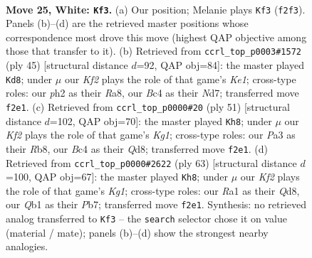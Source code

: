 \documentclass[11pt]{article}
\begin{document}
\clearpage

\begin{figure}[p]\centering
\begin{subfigure}{0.46\textwidth}\centering
\resizebox{\linewidth}{!}{%
\newchessgame
\chessboard[
  setfen={1nb2kr1/4n3/4p3/2q1Pp2/p1B2N2/P7/2P2KPp/RQ5R w - - 0 25},
  showmover=false,
  pgfstyle=straightmove, color=movearrow, markmove={f2-f3}
]}
\caption{}
\end{subfigure}\hfill
\begin{subfigure}{0.46\textwidth}\centering
\resizebox{\linewidth}{!}{%
\newchessgame
\chessboard[
  setfen={r3k2r/1p1nb2p/p1p2q2/2P4B/1P1NQ3/8/P4PP1/3RK3 b kq - 2 23},
  showmover=false,
  pgfstyle=straightmove, color=movearrow, markmove={e8-d8}
]}
\caption{}
\end{subfigure}
\\[4pt]
\begin{subfigure}{0.46\textwidth}\centering
\resizebox{\linewidth}{!}{%
\newchessgame
\chessboard[
  setfen={1r1q1rk1/1b6/4Qp1p/1N4p1/3P3P/P2B2R1/1P4P1/n5K1 b - - 0 26},
  showmover=false,
  pgfstyle=straightmove, color=movearrow, markmove={g8-h8}
]}
\caption{}
\end{subfigure}\hfill
\begin{subfigure}{0.46\textwidth}\centering
\resizebox{\linewidth}{!}{%
\newchessgame
\chessboard[
  setfen={3qr1k1/1pRb4/p2B2Q1/3P1p2/3bp3/7P/PP3PP1/6K1 b - - 5 32},
  showmover=false,
  pgfstyle=straightmove, color=movearrow, markmove={g8-h8}
]}
\caption{}
\end{subfigure}
\caption{\textbf{Move 25, White: \texttt{Kf3}.} (a) Our position; Melanie plays \texttt{Kf3} (\texttt{f2f3}). Panels (b)--(d) are the retrieved master positions whose correspondence most drove this move (highest QAP objective among those that transfer to it). (b) Retrieved from \texttt{ccrl\_top\_p0003\#1572} (ply 45) [structural distance $d$=92, QAP obj=84]: the master played \texttt{Kd8}; under $\mu$ our \emph{Kf2} plays the role of that game's \emph{Ke1}; cross-type roles: our \emph{p}h2 as their \emph{R}a8, our \emph{B}c4 as their \emph{N}d7; transferred move \texttt{f2e1}. (c) Retrieved from \texttt{ccrl\_top\_p0000\#20} (ply 51) [structural distance $d$=102, QAP obj=70]: the master played \texttt{Kh8}; under $\mu$ our \emph{Kf2} plays the role of that game's \emph{Kg1}; cross-type roles: our \emph{P}a3 as their \emph{R}b8, our \emph{B}c4 as their \emph{Q}d8; transferred move \texttt{f2e1}. (d) Retrieved from \texttt{ccrl\_top\_p0000\#2622} (ply 63) [structural distance $d$=100, QAP obj=67]: the master played \texttt{Kh8}; under $\mu$ our \emph{Kf2} plays the role of that game's \emph{Kg1}; cross-type roles: our \emph{R}a1 as their \emph{Q}d8, our \emph{Q}b1 as their \emph{P}b7; transferred move \texttt{f2e1}. Synthesis: no retrieved analog transferred to \texttt{Kf3} -- the \texttt{search} selector chose it on value (material / mate); panels (b)--(d) show the strongest nearby analogies.}
\label{fig:thought-m48}
\end{figure}
\end{document}
